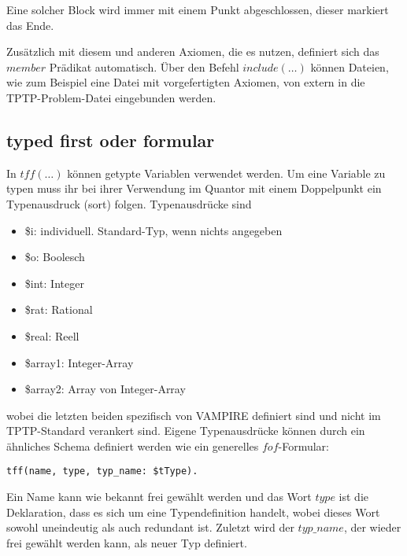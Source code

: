 \documentclass{article}
\begin{document}
Eine solcher Block wird immer mit einem Punkt abgeschlossen, dieser markiert das Ende.

Zusätzlich mit diesem und anderen Axiomen, die es nutzen, definiert sich das $member$ Prädikat automatisch.
Über den Befehl $include(\dots)$ können Dateien, wie zum Beispiel eine Datei mit vorgefertigten Axiomen, von extern in die TPTP-Problem-Datei eingebunden werden.

\subsection{typed first oder formular}
\label{subsec:tptptff}

In $tff(\dots)$ können getypte Variablen verwendet werden. Um eine Variable zu typen muss ihr bei ihrer Verwendung im Quantor mit einem Doppelpunkt ein Typenausdruck (sort) folgen.
Typenausdrücke sind \begin{itemize}
	\item \$i: individuell. Standard-Typ, wenn nichts angegeben
	\item \$o: Boolesch
	\item \$int: Integer
	\item \$rat: Rational
	\item \$real: Reell
	\item \$array1: Integer-Array
	\item \$array2: Array von Integer-Array
\end{itemize}
wobei die letzten beiden spezifisch von VAMPIRE definiert sind und nicht im TPTP-Standard verankert sind.
Eigene Typenausdrücke können durch ein ähnliches Schema definiert werden wie ein generelles $fof$-Formular:
\begin{lstlisting}[language=tptp]
tff(name, type, typ_name: $tType).
\end{lstlisting}
Ein Name kann wie bekannt frei gewählt werden und das Wort $type$ ist die Deklaration, dass es sich um eine Typendefinition handelt, wobei dieses Wort sowohl uneindeutig als auch redundant ist.
Zuletzt wird der $typ\_name$, der wieder frei gewählt werden kann, als neuer Typ definiert.
\end{document}
